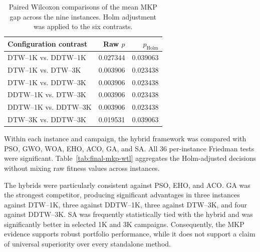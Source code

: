 \documentclass[review]{elsarticle}
\begin{document}
\begin{table}[htbp]
\centering
\caption{Paired Wilcoxon comparisons of the mean MKP gap across the nine
instances. Holm adjustment was applied to the six contrasts.}
\label{tab:final-mkp-config-tests}
\begin{tabular}{lrr}
\toprule
Configuration contrast & Raw $p$ & $p_{\mathrm{Holm}}$ \\
\midrule
DTW--1K vs. DDTW--1K   & 0.027344 & 0.039063 \\
DTW--1K vs. DTW--3K    & 0.003906 & 0.023438 \\
DTW--1K vs. DDTW--3K   & 0.003906 & 0.023438 \\
DDTW--1K vs. DTW--3K   & 0.003906 & 0.023438 \\
DDTW--1K vs. DDTW--3K  & 0.003906 & 0.023438 \\
DTW--3K vs. DDTW--3K   & 0.019531 & 0.039063 \\
\bottomrule
\end{tabular}
\end{table}

Within each instance and campaign, the hybrid framework was compared with
PSO, GWO, WOA, EHO, ACO, GA, and SA. All 36 per-instance Friedman tests were
significant. Table~\ref{tab:final-mkp-wtl} aggregates the Holm-adjusted
decisions without mixing raw fitness values across instances.

\begin{table}[htbp]
\centering
\caption{MKP wins/ties/losses of each hybrid configuration against the seven
standalone metaheuristics over nine instances. Each cell is W/T/L from the
hybrid perspective.}
\label{tab:final-mkp-wtl}
\small
{}
\end{table}

The hybrids were particularly consistent against PSO, EHO, and ACO. GA was
the strongest competitor, producing significant advantages in three
instances against DTW--1K, three against DDTW--1K, three against DTW--3K, and
four against DDTW--3K. SA was frequently statistically tied with the hybrid
and was significantly better in selected 1K and 3K campaigns. Consequently,
the MKP evidence supports robust portfolio performance, while it does not
support a claim of universal superiority over every standalone method.
\end{document}
